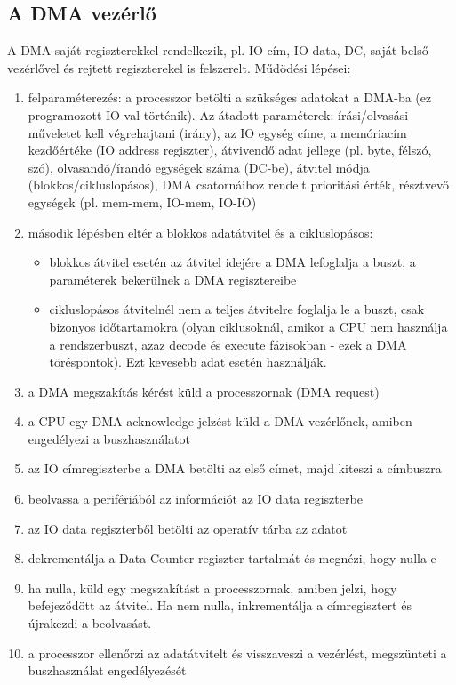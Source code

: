 \subsection{A DMA vezérlő}
A DMA saját regiszterekkel rendelkezik, pl. IO cím, IO data, DC, saját belső vezérlővel és rejtett regiszterekel is felszerelt.
Műdödési lépései:
\begin{enumerate}
    \item felparaméterezés: a processzor betölti a szükséges adatokat a DMA-ba (ez programozott IO-val történik). Az átadott paraméterek: írási/olvasási műveletet kell végrehajtani (irány), az IO egység címe, a memóriacím kezdőértéke (IO address regiszter), átvivendő adat jellege (pl. byte, félszó, szó), olvasandó/írandó egységek száma (DC-be), átvitel módja (blokkos/cikluslopásos), DMA csatornáihoz rendelt prioritási érték, résztvevő egységek (pl. mem-mem, IO-mem, IO-IO)
    \item második lépésben eltér a blokkos adatátvitel és a cikluslopásos:
    \begin{itemize}
        \item blokkos átvitel esetén az átvitel idejére a DMA lefoglalja a buszt, a paraméterek bekerülnek a DMA regisztereibe
        \item cikluslopásos átvitelnél nem a teljes átvitelre foglalja le a buszt, csak bizonyos időtartamokra (olyan ciklusoknál, amikor a CPU nem használja a rendszerbuszt, azaz decode és execute fázisokban - ezek a DMA töréspontok). Ezt kevesebb adat esetén használják.
    \end{itemize}
    \item a DMA megszakítás kérést küld a processzornak (DMA request)
    \item a CPU egy DMA acknowledge jelzést küld a DMA vezérlőnek, amiben engedélyezi a buszhasználatot
    \item az IO címregiszterbe a DMA betölti az első címet, majd kiteszi a címbuszra
    \item beolvassa a perifériából az információt az IO data regiszterbe
    \item az IO data regiszterből betölti az operatív tárba az adatot
    \item dekrementálja a Data Counter regiszter tartalmát és megnézi, hogy nulla-e
    \item ha nulla, küld egy megszakítást a processzornak, amiben jelzi, hogy befejeződött az átvitel. Ha nem nulla, inkrementálja a címregisztert és újrakezdi a beolvasást.
    \item a processzor ellenőrzi az adatátvitelt és visszaveszi a vezérlést, megszünteti a buszhasználat engedélyezését
\end{enumerate}

